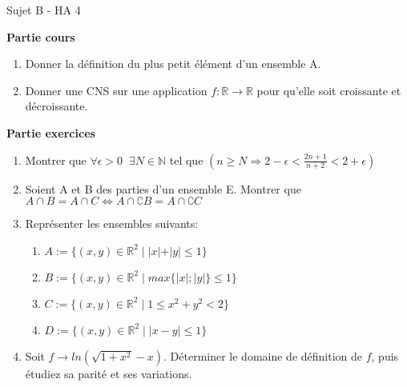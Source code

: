 \documentclass[a4paper,11pt, landscape]{article}
\begin{document}
\begin{multicols*}{4}
\vfill\null
\columnbreak
\centerline{Sujet B - HA 4}

\begin{flushleft}
  \textbf{Partie cours} 
\end{flushleft} 
\begin{enumerate}[leftmargin=*]
  \item Donner la définition du plus petit élément d'un ensemble A.
  \item Donner une CNS sur une application $f : \mathbb{R} \rightarrow \mathbb{R}$ pour qu’elle soit croissante et décroissante.
\end{enumerate}
\textbf{Partie exercices}
\begin{enumerate}[leftmargin=*]
  \item Montrer que $\forall \epsilon > 0 \;\; \exists N \in \mathbb{N}$ tel que $(n \geq N \Rightarrow 2 - \epsilon < \frac{2n+1}{n+2} < 2+\epsilon)$
  \item Soient A et B des parties d'un ensemble E. Montrer que $A \cap B = A \cap C \Leftrightarrow A \cap \complement{B} = A \cap \complement{C}$
  \item Représenter les ensembles suivants:
  \begin{enumerate}
    \item $A:= \{(x,y) \in \mathbb{R}^2 \; | \; |x| + |y| \leq 1 \}$
    \item $B:= \{(x,y) \in \mathbb{R}^2 \; | \; max\{|x|; |y|\} \leq 1 \}$
    \item $C:= \{(x,y) \in \mathbb{R}^2 \; | \; 1 \leq x^2 + y^2 < 2 \}$
    \item $D:= \{(x,y) \in \mathbb{R}^2 \; | \; |x-y| \leq 1\}$
  \end{enumerate}
  \item Soit $f \rightarrow ln\left(\sqrt{1 + x^2} - x\right)$. Déterminer le domaine de définition de $f$, puis étudiez sa parité et ses variations.
  

\end{enumerate}
\end{multicols*}
\end{document}
